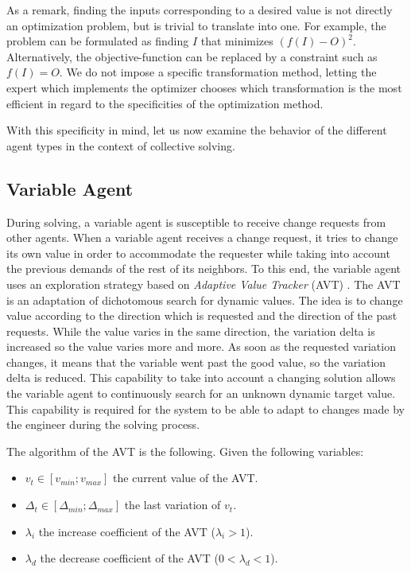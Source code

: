 As a remark, finding the inputs corresponding to a desired value is not directly an optimization problem, but is trivial to translate into one. For example, the problem can be formulated as finding $I$ that minimizes $(f(I) - O)^2$. Alternatively, the objective-function can be replaced by a constraint such as $f(I) = O$. We do not impose a specific transformation method, letting the expert which implements the optimizer chooses which transformation is the most efficient in regard to the specificities of the optimization method.

With this specificity in mind, let us now examine the behavior of the different agent types in the context of collective solving.

\subsection{Variable Agent}\label{variable_agent_solving}

During solving, a variable agent is susceptible to receive change requests from other agents. When a variable agent receives a change request, it tries to change its own value in order to accommodate the requester while taking into account the previous demands of the rest of its neighbors. To this end, the variable agent uses an exploration strategy based on \emph{Adaptive Value Tracker} (AVT) \cite{Lemouzy_2011}. The AVT is an adaptation of dichotomous search for dynamic values. The idea is to change value according to the direction which is requested and the direction of the past requests. While the value varies in the same direction, the variation delta is increased so the value varies more and more. As soon as the requested variation changes, it means that the variable went past the good value, so the variation delta is reduced.
This capability to take into account a changing solution allows the variable agent to continuously search for an unknown dynamic target value. This capability is required for the system to be able to adapt to changes made by the engineer during the solving process.

The algorithm of the AVT is the following. Given the following variables:
\begin{itemize}
\item $v_t \in [v_{min};v_{max}]$ the current value of the AVT.
\item $\Delta_t \in [\Delta_{min};\Delta_{max}]$ the last variation of $v_t$.
\item $\lambda_i$ the increase coefficient of the AVT ($\lambda_i > 1$).
\item $\lambda_d$ the decrease coefficient of the AVT ($0 < \lambda_d < 1$).
\end{itemize}

